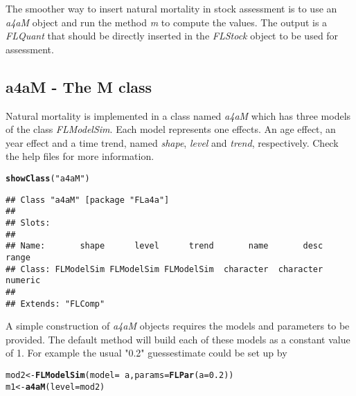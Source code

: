 \documentclass[a4paper,english,10pt]{article}\usepackage[]{graphicx}\usepackage[]{color}
\makeatletter
\newcommand{\hlnum}[1]{\textcolor[rgb]{0.686,0.059,0.569}{#1}}%
\newcommand{\hlstr}[1]{\textcolor[rgb]{0.192,0.494,0.8}{#1}}%
\newcommand{\hlopt}[1]{\textcolor[rgb]{0,0,0}{#1}}%
\newcommand{\hlstd}[1]{\textcolor[rgb]{0.345,0.345,0.345}{#1}}%
\newcommand{\hlkwb}[1]{\textcolor[rgb]{0.69,0.353,0.396}{#1}}%
\newcommand{\hlkwc}[1]{\textcolor[rgb]{0.333,0.667,0.333}{#1}}%
\newcommand{\hlkwd}[1]{\textcolor[rgb]{0.737,0.353,0.396}{\textbf{#1}}}%
\newenvironment{kframe}{%
 \def\at@end@of@kframe{}%
 \ifinner\ifhmode%
  \def\at@end@of@kframe{\end{minipage}}%
  \begin{minipage}{\columnwidth}%
 \fi\fi%
 \def\FrameCommand##1{\hskip\@totalleftmargin \hskip-\fboxsep
 \colorbox{shadecolor}{##1}\hskip-\fboxsep
     \hskip-\linewidth \hskip-\@totalleftmargin \hskip\columnwidth}%
 \MakeFramed {\advance\hsize-\width
   \@totalleftmargin\z@ \linewidth\hsize
   \@setminipage}}%
 {\par\unskip\endMakeFramed%
 \at@end@of@kframe}
\newenvironment{knitrout}{}{} %
\makeatother
\begin{document}
The smoother way to insert natural mortality in stock assessment is to use an \emph{a4aM} object and run the method \emph{m} to compute the values. The output is a \emph{FLQuant} that should be directly inserted in the \emph{FLStock} object to be used for assessment.   

\subsection{a4aM - The M class}

Natural mortality is implemented in a class named \emph{a4aM} which has three models of the class \emph{FLModelSim}. Each model represents one effects. An age effect, an year effect and a time trend, named \emph{shape}, \emph{level} and \emph{trend}, respectively. Check the help files for more information.

\begin{knitrout}
\color{fgcolor}\begin{kframe}
\begin{alltt}
\hlkwd{showClass}\hlstd{(}\hlstr{"a4aM"}\hlstd{)}
\end{alltt}
\begin{verbatim}
## Class "a4aM" [package "FLa4a"]
## 
## Slots:
##                                                                         
## Name:       shape      level      trend       name       desc      range
## Class: FLModelSim FLModelSim FLModelSim  character  character    numeric
## 
## Extends: "FLComp"
\end{verbatim}
\end{kframe}
\end{knitrout}


A simple construction of \emph{a4aM} objects requires the models and parameters to be provided. The default method will build each of these models as a constant value of 1. For example the usual "0.2" guessestimate could be set up by  

\begin{knitrout}
\color{fgcolor}\begin{kframe}
\begin{alltt}
\hlstd{mod2} \hlkwb{<-} \hlkwd{FLModelSim}\hlstd{(}\hlkwc{model} \hlstd{=} \hlopt{~}\hlstd{a,} \hlkwc{params} \hlstd{=} \hlkwd{FLPar}\hlstd{(}\hlkwc{a} \hlstd{=} \hlnum{0.2}\hlstd{))}
\hlstd{m1} \hlkwb{<-} \hlkwd{a4aM}\hlstd{(}\hlkwc{level} \hlstd{= mod2)}
\end{alltt}
\end{kframe}
\end{knitrout}
\end{document}
